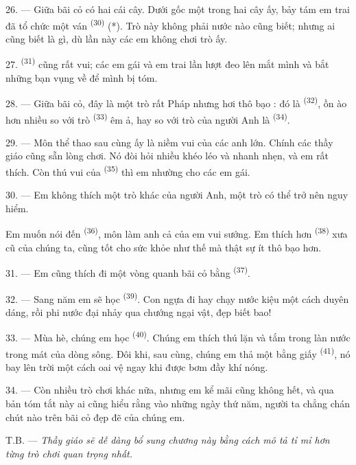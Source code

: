 26. --- Giữa bãi cỏ có hai cái cây. Dưới gốc một trong hai cây ấy, bảy tám em trai đã
tổ chức một ván \textsuperscript{(30)} (*). Trò này không phải nước nào
cũng biết; nhưng ai cũng biết  là gì, dù lần này các em không chơi
trò ấy.

\VUsaut{5.0mm}
\VUsaut{3.4mm}

27. \textsuperscript{(31)} cũng rất vui; các em gái và em trai
lần lượt đeo  lên mắt mình và bắt những bạn vụng về để mình bị tóm.

28. --- Giữa bãi cỏ, đây là một trò rất Pháp nhưng hơi thô bạo : đó là \textsuperscript{(32)}, ồn ào hơn nhiều so với trò \textsuperscript{(33)} êm ả, hay so với trò của người Anh là \textsuperscript{(34)}.

29. --- Môn thể thao sau cùng ấy là niềm vui của các anh lớn. Chính các thầy giáo cũng
sẵn lòng chơi. Nó đòi hỏi nhiều khéo léo và nhanh nhẹn, và em rất thích. Còn thú vui của
\textsuperscript{(35)} thì em nhường cho các em gái.

30. --- Em không thích một trò khác của người Anh, một trò có thể trở nên nguy hiểm.

Em muốn nói đến \textsuperscript{(36)}, môn làm anh cả của em vui sướng.
Em thích hơn \textsuperscript{(38)} xưa cũ của chúng ta, cũng tốt
cho sức khỏe như thế mà thật sự ít thô bạo hơn.

\VUsaut{4.6mm}
\VUsaut{3.0mm}

31. --- Em cũng thích đi một vòng quanh bãi cỏ bằng \textsuperscript{(37)}.

32. --- Sang năm em sẽ học \textsuperscript{(39)}. Con ngựa đi hay
chạy nước kiệu một cách duyên dáng, rồi phi nước đại nhảy qua chướng ngại vật, đẹp biết
bao!

33. --- Mùa hè, chúng em học \textsuperscript{(40)}. Chúng em thích thú lặn
và tắm trong làn nước trong mát của dòng sông. Đôi khi, sau cùng, chúng em thả một
 bằng giấy \textsuperscript{(41)}, nó bay lên trời một cách oai vệ
ngay khi được bơm đầy khí nóng.

34. --- Còn nhiều trò chơi khác nữa, nhưng em kể mãi cũng không hết, và qua bản tóm tắt
này ai cũng hiểu rằng vào những ngày thứ năm, người ta chẳng chán chút nào trên bãi cỏ
đẹp đẽ của chúng em.

T.B. --- \textit{Thầy giáo sẽ dễ dàng bổ sung chương này bằng cách mô tả tỉ mỉ hơn từng
trò chơi quan trọng nhất.}
\VUsaut{6.0mm}
\VUfilet{22mm}
